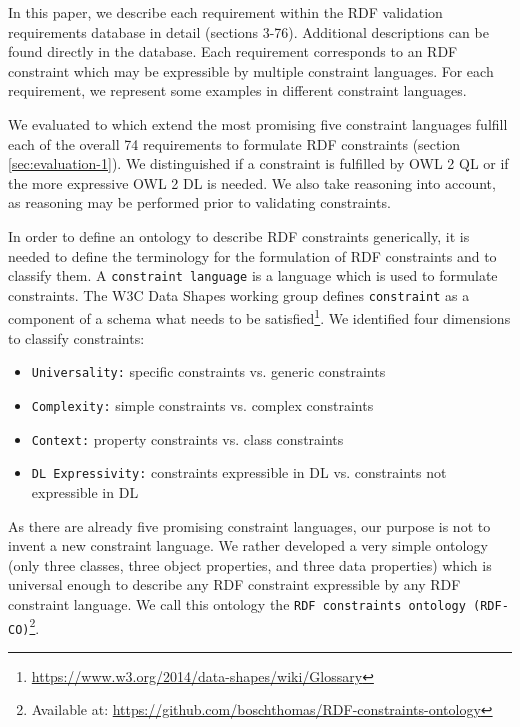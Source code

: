 \documentclass{llncs}
\newcommand{\ms}[1]{\texttt{#1}}
\begin{document}
In this paper, we describe each requirement within the RDF validation requirements database in detail (sections 3-76).
Additional descriptions can be found directly in the database.
Each requirement corresponds to an RDF constraint which may be expressible by multiple constraint languages.
For each requirement, we represent some examples in different constraint languages.

We evaluated to which extend the most promising five constraint languages fulfill each of the overall 74 requirements to formulate RDF constraints (section \ref{sec:evaluation-1}).
We distinguished if a constraint is fulfilled by OWL 2 QL or if the more expressive OWL 2 DL is needed. 
We also take reasoning into account, as reasoning may be performed prior to validating constraints.

In order to define an ontology to describe RDF constraints generically, it is needed to define the terminology for the formulation of RDF constraints and to classify them. 
A \ms{constraint language} is a language which is used to formulate constraints.
The W3C Data Shapes working group defines \ms{constraint} as a component of a schema what needs to be satisfied\footnote{\url{https://www.w3.org/2014/data-shapes/wiki/Glossary}}.
We identified four dimensions to classify constraints:
\begin{itemize}
  \item \ms{Universality:} specific constraints vs. generic constraints
	\item \ms{Complexity:} simple constraints vs. complex constraints
	\item \ms{Context:} property constraints vs. class constraints
	\item \ms{DL Expressivity:} constraints expressible in DL vs. constraints not expressible in DL
\end{itemize}

As there are already five promising constraint languages, our purpose is not to invent a new constraint language.
We rather developed a very simple ontology (only three classes, three object properties, and three data properties) which is universal enough to describe any RDF constraint expressible by any RDF constraint language.
We call this ontology the \ms{RDF constraints ontology (RDF-CO)}\footnote{Available at: \url{https://github.com/boschthomas/RDF-constraints-ontology}}.
\end{document}
